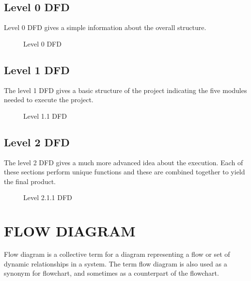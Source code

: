 \documentclass[12pt,a4paper,oneside]{report}
\begin{document}
{\newpage
\subsection{Level 0 DFD}
Level 0 DFD gives a simple information about the overall structure. 
\begin{figure}[h!]
\begin{center}

\hspace{1 in}
\caption{Level 0 DFD}
\end{center}
\end{figure}

\subsection{Level 1 DFD}
The level 1 DFD gives a basic structure of the project indicating the five modules needed to execute the project.
\newpage
\begin{figure}[h]
\begin{center}
\hspace{1 in}
\caption{Level 1.1 DFD}
\end{center}
\vspace{-1.5 in}
\end{figure}

\vspace{100pt}
\subsection{Level 2 DFD}
The level 2 DFD gives a much more advanced idea about the execution. Each of these sections perform unique functions and these are combined together to yield the final product.
\begin{figure}[h]
\begin{center}
\vspace{0.5 in}
\hspace{.0 in}
\caption{Level 2.1.1 DFD}
\end{center}

\end{figure}
\pagebreak

\section{FLOW DIAGRAM}
Flow diagram is a collective term for a diagram representing a flow or set of dynamic relationships in a system. The term flow diagram is also used as a synonym for flowchart, and sometimes as a counterpart of the flowchart.

}
\end{document}
